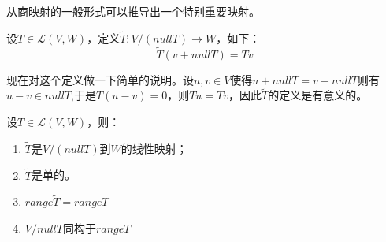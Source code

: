 \documentclass[10pt,a4paper,UTF8]{article}
\begin{document}
从商映射的一般形式可以推导出一个特别重要映射。
\begin{definition}
设\(T\in \mathcal{L}(V,W)\)，定义\(\tilde{T}:V/(nullT) \rightarrow W\)，如下：
\begin{equation}
\label{eq:10}
\tilde{T}(v + nullT) = Tv
\end{equation}
\end{definition}

现在对这个定义做一下简单的说明。设\(u,v\in V\)使得\(u+nullT = v+ nullT\)则有\(u-v\in nullT\),于是\(T(u-v) = 0\)，则\(Tu=Tv\)，因此\(\tilde{T}\)的定义是有意义的。

\begin{theorem}
设\(T\in \mathcal{L}(V,W)\)，则：
\begin{enumerate}
\item \(\tilde{T}\)是\(V/(nullT)\)到\(W\)的线性映射；
\item \(\tilde{T}\)是单的。
\item \(range \tilde{T} = range T\)
\item \(V/nullT\)同构于\(rangeT\)
\end{enumerate}
\end{theorem}
\end{document}
